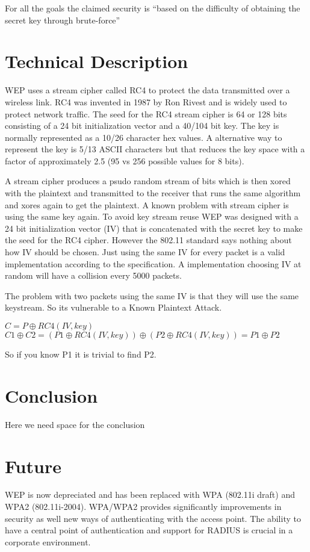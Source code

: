 \documentclass[twocolumn,11pt]{IEEEtran}
\begin{document}
For all the goals the claimed security is ``based on the difficulty of obtaining the secret key through brute-force'' \cite{IEEE:Fast}



\section {Technical Description}
\label{sec:technical_description}

WEP uses a stream cipher called RC4 to protect the data transmitted over a wireless link. RC4 was invented in 1987 by Ron Rivest and is widely used to protect network traffic. The seed for the RC4 stream cipher is 64 or 128 bits consisting of a 24 bit initialization vector and a 40/104 bit key. The key is normally represented as a 10/26 character hex values. A alternative way to represent the key is 5/13 ASCII characters but that reduces the key space with a factor of approximately 2.5 (95 vs 256 possible values for 8 bits).

A stream cipher produces a psudo random stream of bits which is then xored with the plaintext and transmitted to the receiver that runs the same algorithm and xores again to get the plaintext. A known problem with stream cipher is using the same key again. To avoid key stream reuse WEP was designed with a 24 bit initialization vector (IV) that is concatenated with the secret key to make the seed for the RC4 cipher. However the 802.11 standard says nothing about how IV should be chosen. Just using the same IV for every packet is a valid implementation according to the specification. A implementation choosing IV at random will have a collision every 5000 packets. 

The problem with two packets using the same IV is that they will use the same keystream. So its vulnerable to a Known Plaintext Attack.

$C = P \oplus RC4(IV,key)$ \\
$C1 \oplus C2 = (P1 \oplus RC4(IV,key) ) \oplus ( P2 \oplus RC4(IV,key)) = P1 \oplus P2 $

So if you know P1 it is trivial to find P2. 

\section {Conclusion}
\label{sec:conclusion}

Here we need space for the conclusion



\section {Future}
\label{sec:future}

WEP is now depreciated and has been replaced with WPA (802.11i draft) and WPA2 (802.11i-2004). WPA/WPA2 provides significantly improvements in security as well new ways of authenticating with the access point. The ability to have a central point  of authentication and support for RADIUS is crucial in a corporate environment.






\end{document}
